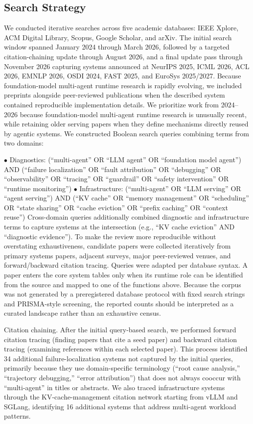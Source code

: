 \documentclass[preprint,12pt]{elsarticle}
\begin{document}
\subsection{Search Strategy}
We conducted iterative searches across five academic databases: IEEE Xplore, ACM Digital Library, Scopus, Google Scholar, and arXiv. The initial search window spanned January 2024 through March 2026, followed by a targeted citation-chaining update through August 2026, and a final update pass through November 2026 capturing systems announced at NeurIPS 2025, ICML 2026, ACL 2026, EMNLP 2026, OSDI 2024, FAST 2025, and EuroSys 2025/2027. Because foundation-model multi-agent runtime research is rapidly evolving, we included preprints alongside peer-reviewed publications when the described system contained reproducible implementation details. We prioritize work from 2024--2026 because foundation-model multi-agent runtime research is unusually recent, while retaining older serving papers when they define mechanisms directly reused by agentic systems. We constructed Boolean search queries combining terms from two domains:


$\bullet$ Diagnostics: (``multi-agent'' OR ``LLM agent'' OR ``foundation model agent'') AND (``failure localization'' OR ``fault attribution'' OR ``debugging'' OR ``observability'' OR ``tracing'' OR ``guardrail'' OR ``safety intervention'' OR ``runtime monitoring'') $\bullet$ Infrastructure: (``multi-agent'' OR ``LLM serving'' OR ``agent serving'') AND (``KV cache'' OR ``memory management'' OR ``scheduling'' OR ``state sharing'' OR ``cache eviction'' OR ``prefix caching'' OR ``context reuse'') Cross-domain queries additionally combined diagnostic and infrastructure terms to capture systems at the intersection (e.g., ``KV cache eviction'' AND ``diagnostic evidence''). To make the review more reproducible without overstating exhaustiveness, candidate papers were collected iteratively from primary systems papers, adjacent surveys, major peer-reviewed venues, and forward/backward citation tracing. Queries were adapted per database syntax. A paper enters the core system tables only when its runtime role can be identified from the source and mapped to one of the functions above. Because the corpus was not generated by a preregistered database protocol with fixed search strings and PRISMA-style screening, the reported counts should be interpreted as a curated landscape rather than an exhaustive census.


Citation chaining. After the initial query-based search, we performed forward citation tracing (finding papers that cite a seed paper) and backward citation tracing (examining references within each selected paper). This process identified 34 additional failure-localization systems not captured by the initial queries, primarily because they use domain-specific terminology (``root cause analysis,'' ``trajectory debugging,'' ``error attribution'') that does not always cooccur with ``multi-agent'' in titles or abstracts. We also traced infrastructure systems through the KV-cache-management citation network starting from vLLM and SGLang, identifying 16 additional systems that address multi-agent workload patterns.
\end{document}
